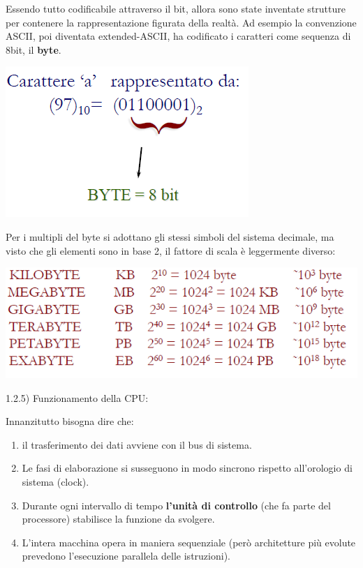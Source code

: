 \documentclass[
  paper=a4,
  oneside  ,captions=tableheading
]{scrbook}
\providecommand{\tightlist}{%
  \setlength{\itemsep}{0pt}\setlength{\parskip}{0pt}}
\begin{document}
Essendo tutto codificabile attraverso il bit, allora sono state
inventate strutture per contenere la rappresentazione figurata della
realtà. Ad esempio la convenzione ASCII, poi diventata extended-ASCII,
ha codificato i caratteri come sequenza di 8bit, il \textbf{byte}.

\includegraphics{./image/image-20201111184647324.png}

Per i multipli del byte si adottano gli stessi simboli del sistema
decimale, ma visto che gli elementi sono in base 2, il fattore di scala
è leggermente diverso:

\includegraphics{./image/image-20201111184937248.png}

1.2.5) Funzionamento della CPU:

Innanzitutto bisogna dire che:

\begin{enumerate}
\def\labelenumi{\arabic{enumi}.}
\tightlist
\item
  il trasferimento dei dati avviene con il bus di sistema.
\item
  Le fasi di elaborazione si susseguono in modo sincrono rispetto
  all'orologio di sistema (clock).
\item
  Durante ogni intervallo di tempo \textbf{l'unità di controllo} (che fa
  parte del processore) stabilisce la funzione da svolgere.
\item
  L'intera macchina opera in maniera sequenziale (però architetture più
  evolute prevedono l'esecuzione parallela delle istruzioni).
\end{enumerate}
\end{document}
